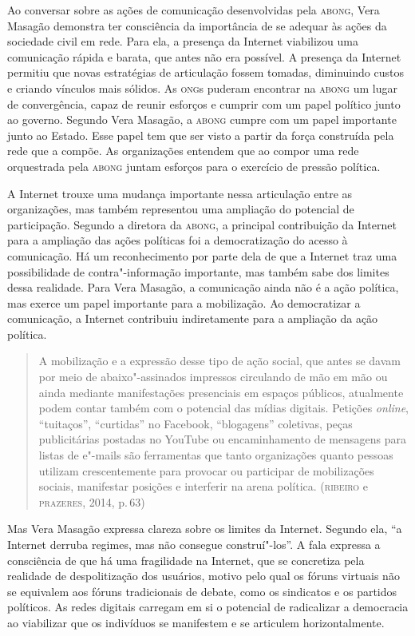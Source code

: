 Ao conversar sobre as ações de comunicação desenvolvidas pela \textsc{abong},
Vera Masagão demonstra ter consciência da importância de se adequar às
ações da sociedade civil em rede. Para ela, a presença da Internet
viabilizou uma comunicação rápida e barata, que antes não era possível.
A presença da Internet permitiu que novas estratégias de articulação
fossem tomadas, diminuindo custos e criando vínculos mais sólidos. As
\textsc{ong}s puderam encontrar na \textsc{abong} um lugar de convergência, capaz de
reunir esforços e cumprir com um papel político junto ao governo.
Segundo Vera Masagão, a \textsc{abong} cumpre com um papel importante junto ao
Estado. Esse papel tem que ser visto a partir da força construída pela
rede que a compõe. As organizações entendem que ao compor uma rede
orquestrada pela \textsc{abong} juntam esforços para o exercício de pressão
política.

A Internet trouxe uma mudança importante nessa articulação entre as
organizações, mas também representou uma ampliação do potencial de
participação. Segundo a diretora da \textsc{abong}, a principal contribuição da
Internet para a ampliação das ações políticas foi a democratização do
acesso à comunicação. Há um reconhecimento por parte dela de que a
Internet traz uma possibilidade de contra"-informação importante, mas
também sabe dos limites dessa realidade. Para Vera Masagão, a
comunicação ainda não é a ação política, mas exerce um papel importante
para a mobilização. Ao democratizar a comunicação, a Internet contribuiu
indiretamente para a ampliação da ação política.

\begin{quote}
A mobilização e a expressão desse tipo de ação social, que antes se
davam por meio de abaixo"-assinados impressos circulando de mão em mão ou
ainda mediante manifestações presenciais em espaços públicos, atualmente
podem contar também com o potencial das mídias digitais. Petições
\textit{online}, ``tuitaços'', ``curtidas'' no Facebook, ``blogagens''
coletivas, peças publicitárias postadas no YouTube ou encaminhamento de
mensagens para listas de e"-mails são ferramentas que tanto organizações
quanto pessoas utilizam crescentemente para provocar ou participar de
mobilizações sociais, manifestar posições e interferir na arena
política. (\textsc{ribeiro} e \textsc{prazeres}, 2014, p.\,63)
\end{quote}

Mas Vera Masagão expressa clareza sobre os limites da Internet. Segundo
ela, ``a Internet derruba regimes, mas não consegue construí"-los''. A
fala expressa a consciência de que há uma fragilidade na Internet, que
se concretiza pela realidade de despolitização dos usuários, motivo pelo
qual os fóruns virtuais não se equivalem aos fóruns tradicionais de
debate, como os sindicatos e os partidos políticos. As redes digitais
carregam em si o potencial de radicalizar a democracia ao viabilizar que
os indivíduos se manifestem e se articulem horizontalmente.

